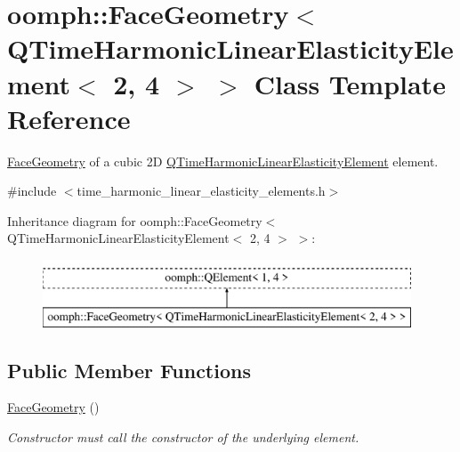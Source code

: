 \hypertarget{classoomph_1_1FaceGeometry_3_01QTimeHarmonicLinearElasticityElement_3_012_00_014_01_4_01_4}{}\section{oomph\+:\+:Face\+Geometry$<$ Q\+Time\+Harmonic\+Linear\+Elasticity\+Element$<$ 2, 4 $>$ $>$ Class Template Reference}
\label{classoomph_1_1FaceGeometry_3_01QTimeHarmonicLinearElasticityElement_3_012_00_014_01_4_01_4}


\hyperlink{classoomph_1_1FaceGeometry}{Face\+Geometry} of a cubic 2D \hyperlink{classoomph_1_1QTimeHarmonicLinearElasticityElement}{Q\+Time\+Harmonic\+Linear\+Elasticity\+Element} element.  




{\ttfamily \#include $<$time\+\_\+harmonic\+\_\+linear\+\_\+elasticity\+\_\+elements.\+h$>$}

Inheritance diagram for oomph\+:\+:Face\+Geometry$<$ Q\+Time\+Harmonic\+Linear\+Elasticity\+Element$<$ 2, 4 $>$ $>$\+:\begin{figure}[H]
\begin{center}
\leavevmode
\includegraphics[height=2.000000cm]{classoomph_1_1FaceGeometry_3_01QTimeHarmonicLinearElasticityElement_3_012_00_014_01_4_01_4}
\end{center}
\end{figure}
\subsection*{Public Member Functions}
\begin{DoxyCompactItemize}
\item 
\hyperlink{classoomph_1_1FaceGeometry_3_01QTimeHarmonicLinearElasticityElement_3_012_00_014_01_4_01_4_a2a7329c39181450f066d112416db9a04}{Face\+Geometry} ()
\begin{DoxyCompactList}\small\item\em Constructor must call the constructor of the underlying element. \end{DoxyCompactList}\end{DoxyCompactItemize}


